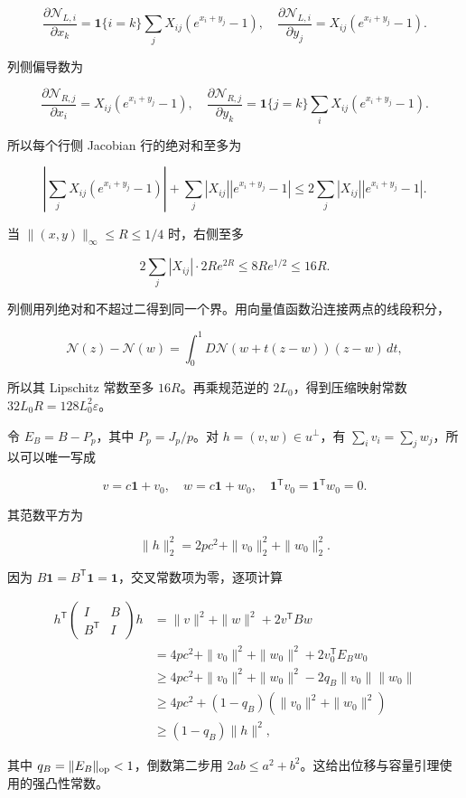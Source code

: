 \documentclass[11pt,a4paper]{article}
\begin{document}
\[
\frac{\partial\mathcal N_{L,i}}{\partial x_k}
=\mathbf1\{i=k\}\sum_jX_{ij}(e^{x_i+y_j}-1),\quad
\frac{\partial\mathcal N_{L,i}}{\partial y_j}=X_{ij}(e^{x_i+y_j}-1).
\]

列侧偏导数为

\[
\frac{\partial\mathcal N_{R,j}}{\partial x_i}=X_{ij}(e^{x_i+y_j}-1),\quad
\frac{\partial\mathcal N_{R,j}}{\partial y_k}
=\mathbf1\{j=k\}\sum_iX_{ij}(e^{x_i+y_j}-1).
\]

所以每个行侧 Jacobian 行的绝对和至多为

\[
\left|\sum_jX_{ij}(e^{x_i+y_j}-1)\right|
+\sum_j|X_{ij}||e^{x_i+y_j}-1|
\le2\sum_j|X_{ij}||e^{x_i+y_j}-1|.
\]

当 \(\|(x,y)\|_\infty\le R\le1/4\) 时，右侧至多

\[
2\sum_j|X_{ij}|\cdot2Re^{2R}\le8Re^{1/2}\le16R.
\]

列侧用列绝对和不超过二得到同一个界。用向量值函数沿连接两点的线段积分，

\[
\mathcal N(z)-\mathcal N(w)=\int_0^1D\mathcal N(w+t(z-w))(z-w)\,dt,
\]

所以其 Lipschitz 常数至多 \(16R\)。再乘规范逆的 \(2L_0\)，得到压缩映射常数 \(32L_0R=128L_0^2\varepsilon\)。

令 \(E_B=B-P_p\)，其中 \(P_p=J_p/p\)。对 \(h=(v,w)\in u^\perp\)，有 \(\sum_iv_i=\sum_jw_j\)，所以可以唯一写成

\[
v=c\mathbf1+v_0,\quad w=c\mathbf1+w_0,\quad
\mathbf1^{\mathsf T}v_0=\mathbf1^{\mathsf T}w_0=0.
\]

其范数平方为

\[
\|h\|_2^2=2pc^2+\|v_0\|_2^2+\|w_0\|_2^2.
\]

因为 \(B\mathbf1=B^{\mathsf T}\mathbf1=\mathbf1\)，交叉常数项为零，逐项计算

\[
\begin{aligned}
h^{\mathsf T}\begin{pmatrix}I&B\\B^{\mathsf T}&I\end{pmatrix}h
&=\|v\|^2+\|w\|^2+2v^{\mathsf T}Bw\\
&=4pc^2+\|v_0\|^2+\|w_0\|^2+2v_0^{\mathsf T}E_Bw_0\\
&\ge4pc^2+\|v_0\|^2+\|w_0\|^2-2q_B\|v_0\|\|w_0\|\\
&\ge4pc^2+(1-q_B)(\|v_0\|^2+\|w_0\|^2)\\
&\ge(1-q_B)\|h\|^2,
\end{aligned}
\]

其中 \(q_B=\|E_B\|_{\rm op}<1\)，倒数第二步用 \(2ab\le a^2+b^2\)。这给出位移与容量引理使用的强凸性常数。
\end{document}
